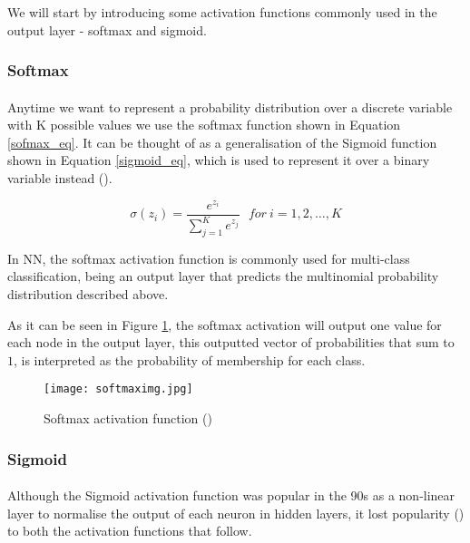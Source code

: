 We will start by introducing some activation functions commonly used in the output layer - softmax and sigmoid.

\subsubsection{Softmax}
\paragraph{}
Anytime we want to represent a probability distribution over a discrete variable with K possible values we use the softmax function shown in Equation \ref{sofmax_eq}. It can be thought of as a generalisation of the Sigmoid function shown in Equation \ref{sigmoid_eq}, which is used to represent it over a binary variable instead (\cite{GoodBengCour16}).

\begin{equation}
    \label{sofmax_eq}
    \sigma(z_i) = \frac{e^{z_{i}}}{\sum_{j=1}^K e^{z_{j}}} \ \ \ for\ i=1,2,\dots,K
\end{equation}

In \gls{NN}, the softmax activation function is commonly used for multi-class classification, being an output layer that predicts the multinomial probability distribution described above.

As it can be seen in Figure \ref{fig_softmax}, the softmax activation will output one value for each node in the output layer, this outputted vector of probabilities that sum to $1$, is interpreted as the probability of membership for each class.

\begin{figure}[hbt!]
    \centering
    \texttt{[image: softmaximg.jpg]}
    \caption{Softmax activation function (\cite{softmaxpic})}
    \label{fig_softmax}
\end{figure}

\subsubsection{Sigmoid}
\paragraph{}
Although the Sigmoid activation function was popular in the 90s as a non-linear layer to normalise the output of each neuron in hidden layers, it lost popularity (\cite{GoodBengCour16}) to both the activation functions that follow.


